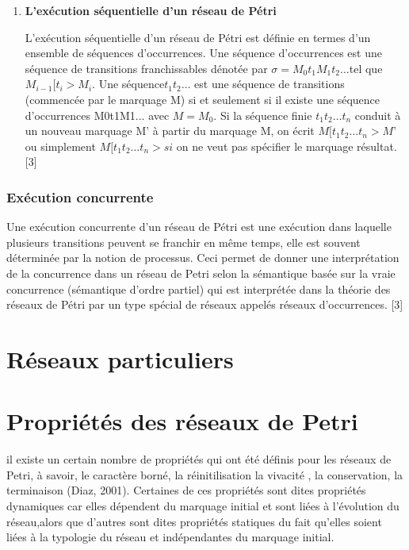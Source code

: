 \begin{enumerate}
  
  \item \textbf{L'exécution séquentielle d'un réseau de Pétri }
  
  L'exécution séquentielle d'un réseau de Pétri est définie en termes d'un ensemble de séquences d'occurrences. Une séquence d'occurrences est une séquence de transitions franchissables dénotée par $ \sigma =M_{0} t_{1} M_{1} t_{2}…$tel que $M_{i-1}[t_{i} > M_{i}$. Une séquence$ t_{1} t_{2}…$ est une séquence de transitions (commencée par le marquage M) si et seulement si il existe une séquence d'occurrences M0t1M1... avec $M=M_{0}$. Si la séquence finie $t_{1} t_{2}…t_{n}$ conduit à un nouveau marquage M' à partir du marquage M, on écrit $M[t_{1} t_{2}…t_{n} > M’$ ou simplement $M[t_{1} t_{2}…t_{n} >  si $ on ne veut pas spécifier le marquage résultat. [3] 
  
  
  
  
  
\end{enumerate}



\subsubsection*{Exécution concurrente }


Une exécution concurrente d'un réseau de Pétri est une exécution dans laquelle  plusieurs transitions peuvent se franchir en même temps, elle est souvent déterminée par la notion de processus. Ceci permet de donner une interprétation de la concurrence dans un réseau de Petri selon la sémantique basée sur la vraie concurrence (sémantique d'ordre partiel) qui est interprétée dans la théorie des réseaux de Pétri par un type spécial de réseaux appelés réseaux d'occurrences. [3] 



 \section{Réseaux particuliers }



\section{Propriétés des réseaux de Petri}
il existe un certain nombre de propriétés qui ont été définis pour les réseaux de Petri, à savoir, le caractère borné, la réinitilisation la vivacité , la conservation, la terminaison (Diaz, 2001). Certaines de ces propriétés sont dites propriétés dynamiques car elles dépendent du marquage initial et sont liées à l'évolution du réseau,alors que d'autres sont dites propriétés statiques du fait qu'elles soient liées à la typologie du réseau et indépendantes du marquage initial.

